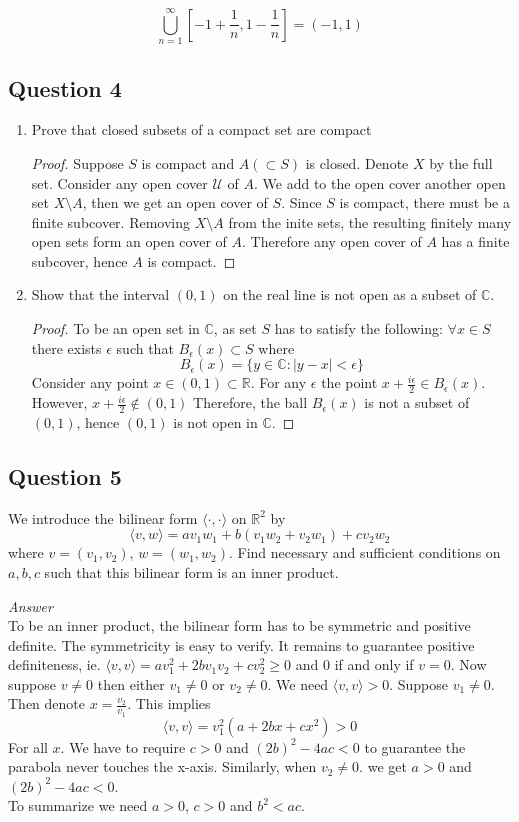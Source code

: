 \documentclass{tufte-book}
\newcommand{\dprod}[2]{\langle #1, #2 \rangle}
\theoremstyle{mytheoremstyle}
\theoremstyle{mylemstyle}
\theoremstyle{mydefstyle}
\begin{document}
\[\bigcup_{n=1}^{\infty}[-1+\frac{1}{n}, 1-\frac{1}{n}] = (-1,1)\]

\subsection{Question 4}
\begin{enumerate}
\item Prove that closed subsets of a compact set are compact

\begin{proof}
Suppose $S$ is compact and $A (\subset S)$ is closed.  Denote $X$ by the full set.  Consider any open cover $\mathcal{U}$ of $A$.  We add to the open cover another open set $X \setminus A$, then we get an open cover of $S$.
Since $S$ is compact, there must be a finite subcover.  Removing $X \setminus A$ from the inite sets, the resulting finitely many open sets form an open cover of $A$.  Therefore any open cover of $A$ has a finite subcover, hence $A$ is compact.
\end{proof}

\item Show that the interval $(0,1)$ on the real line is not open as a subset of $\mathbb{C}$.

\begin{proof}
To be an open set in $\mathbb{C}$, as set $S$ has to satisfy the following: $\forall x \in S$ there exists $\epsilon$ such that $B_\epsilon(x) \subset S$ where
\[B_\epsilon(x) = \{y \in \mathbb{C} : |y-x| < \epsilon\} \]
Consider any point $x \in (0,1) \subset \mathbb{R}$. For any $\epsilon$ the point $x + \frac{i\epsilon}{2} \in B_\epsilon(x)$.  However, $x + \frac{i\epsilon}{2} \notin (0,1)$  Therefore, the ball $B_\epsilon(x)$ is not a subset of $(0,1)$, hence $(0,1)$ is not open in $\mathbb{C}$.
\end{proof}

\end{enumerate}
\subsection{Question 5} We introduce the bilinear form $\dprod{\cdot}{\cdot}$ on $\mathbb{R}^2$ by 
\[ \dprod{v}{w} = av_1w_1 + b(v_1w_2 + v_2w_1) + cv_2w_2 \]
where $v=(v_1, v_2)$, $w=(w_1,w_2)$.  Find necessary and sufficient conditions on $a,b,c$ such that this bilinear form is an inner product.

\textit{Answer}\\
To be an inner product, the bilinear form has to be symmetric and positive definite.  The symmetricity is easy to verify.  It remains to guarantee  positive definiteness, ie. $\dprod{v}{v}=av_1^2 + 2bv_1v_2 + cv_2^2 \geq 0$ and $0$ if and only if $v=0$.  Now suppose $v \neq 0$ then either $v_1 \neq 0$ or $v_2 \neq 0$. We need $\dprod{v}{v} > 0$.
Suppose $v_1 \neq 0$. Then denote $x = \frac{v_2}{v_1}$.  This implies
\[ \dprod{v}{v} = v_1^2(a + 2bx + cx^2) > 0\]
For all $x$.  We have to require $c>0$ and $(2b)^2-4ac<0$ to guarantee the parabola never touches the x-axis. Similarly, when $v_2 \neq 0$. we get $a>0$ and $(2b)^2-4ac<0$.\\
To summarize we need $a>0$, $c>0$ and $b^2<ac$.
\end{document}
